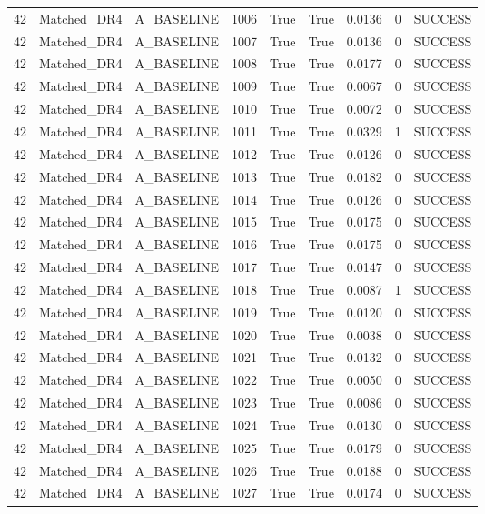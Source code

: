 \documentclass[11pt,a4paper,oneside]{book}
\begin{document}
\begin{longtable}{l l l l l l l l l}
42 & Matched\_DR4 & A\_BASELINE & 1006 & True & True & 0.0136 & 0 & SUCCESS \\
42 & Matched\_DR4 & A\_BASELINE & 1007 & True & True & 0.0136 & 0 & SUCCESS \\
42 & Matched\_DR4 & A\_BASELINE & 1008 & True & True & 0.0177 & 0 & SUCCESS \\
42 & Matched\_DR4 & A\_BASELINE & 1009 & True & True & 0.0067 & 0 & SUCCESS \\
42 & Matched\_DR4 & A\_BASELINE & 1010 & True & True & 0.0072 & 0 & SUCCESS \\
42 & Matched\_DR4 & A\_BASELINE & 1011 & True & True & 0.0329 & 1 & SUCCESS \\
42 & Matched\_DR4 & A\_BASELINE & 1012 & True & True & 0.0126 & 0 & SUCCESS \\
42 & Matched\_DR4 & A\_BASELINE & 1013 & True & True & 0.0182 & 0 & SUCCESS \\
42 & Matched\_DR4 & A\_BASELINE & 1014 & True & True & 0.0126 & 0 & SUCCESS \\
42 & Matched\_DR4 & A\_BASELINE & 1015 & True & True & 0.0175 & 0 & SUCCESS \\
42 & Matched\_DR4 & A\_BASELINE & 1016 & True & True & 0.0175 & 0 & SUCCESS \\
42 & Matched\_DR4 & A\_BASELINE & 1017 & True & True & 0.0147 & 0 & SUCCESS \\
42 & Matched\_DR4 & A\_BASELINE & 1018 & True & True & 0.0087 & 1 & SUCCESS \\
42 & Matched\_DR4 & A\_BASELINE & 1019 & True & True & 0.0120 & 0 & SUCCESS \\
42 & Matched\_DR4 & A\_BASELINE & 1020 & True & True & 0.0038 & 0 & SUCCESS \\
42 & Matched\_DR4 & A\_BASELINE & 1021 & True & True & 0.0132 & 0 & SUCCESS \\
42 & Matched\_DR4 & A\_BASELINE & 1022 & True & True & 0.0050 & 0 & SUCCESS \\
42 & Matched\_DR4 & A\_BASELINE & 1023 & True & True & 0.0086 & 0 & SUCCESS \\
42 & Matched\_DR4 & A\_BASELINE & 1024 & True & True & 0.0130 & 0 & SUCCESS \\
42 & Matched\_DR4 & A\_BASELINE & 1025 & True & True & 0.0179 & 0 & SUCCESS \\
42 & Matched\_DR4 & A\_BASELINE & 1026 & True & True & 0.0188 & 0 & SUCCESS \\
42 & Matched\_DR4 & A\_BASELINE & 1027 & True & True & 0.0174 & 0 & SUCCESS \\

\end{longtable}
\end{document}
